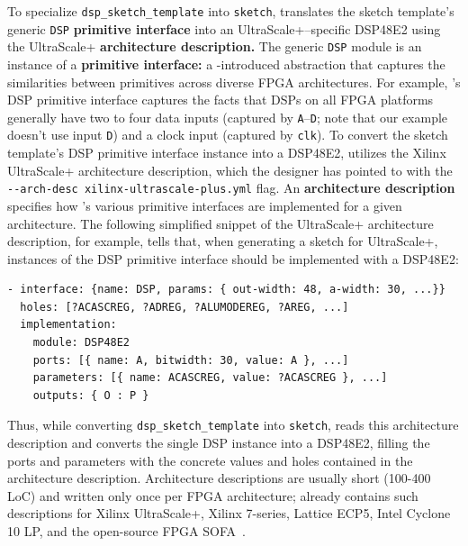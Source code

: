 To specialize \texttt{dsp\_sketch\_template}
  into \texttt{sketch},
  \lr translates
  the sketch template's generic \texttt{DSP}
  \textbf{primitive interface}
  into an UltraScale+--specific
  DSP48E2
  using the UltraScale+
  \textbf{architecture description.}
The generic \texttt{DSP}
  module is an instance of a
  \textbf{primitive interface:} 
  a \lr-introduced abstraction that 
  captures the similarities
  between primitives across 
  diverse FPGA architectures.
For example, 
  \lr's DSP primitive interface
  captures the facts that
  DSPs on all FPGA platforms
  generally have two to four data inputs
  (captured by \texttt{A}--\texttt{D};
  note that our example doesn't use
  input \texttt{D})
  and a clock input
  (captured by \texttt{clk}).
To convert the
  sketch template's
  DSP primitive interface instance
  into a DSP48E2,
  \lr utilizes the
  Xilinx UltraScale+ architecture description,
  which the designer has pointed to with the 
  \texttt{-{}-arch-desc xilinx-ultrascale-plus.yml}
  flag.
An \textbf{architecture description}
  specifies how \lr's various
  primitive interfaces
  are implemented for a given architecture.
The following simplified snippet of the UltraScale+
  architecture description, for example,
  tells \lr that,
  when generating a sketch for 
  UltraScale+,
  instances of the DSP
  primitive interface
  should be implemented with a DSP48E2:
\begin{verbatim}
- interface: {name: DSP, params: { out-width: 48, a-width: 30, ...}} 
  holes: [?ACASCREG, ?ADREG, ?ALUMODEREG, ?AREG, ...]
  implementation:
    module: DSP48E2
    ports: [{ name: A, bitwidth: 30, value: A }, ...]
    parameters: [{ name: ACASCREG, value: ?ACASCREG }, ...]
    outputs: { O : P }
\end{verbatim}
Thus, while converting
  \texttt{dsp\_sketch\_template}
  into
  \texttt{sketch},
  \lr reads this architecture description
  and converts the single DSP instance
  into a DSP48E2,
  filling the ports and parameters with the concrete values
  and holes
  contained in the architecture description.
Architecture descriptions
  are usually short (100-400 LoC)
  and
  written only once per FPGA architecture; 
  \lr already contains such descriptions
  for Xilinx UltraScale+,
  Xilinx 7-series,
  Lattice ECP5,
  Intel Cyclone 10 LP,
  and the open-source FPGA SOFA~\cite{sofa}.

